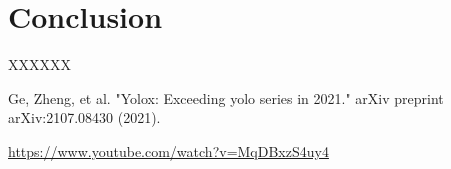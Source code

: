 \documentclass[lettersize,journal]{IEEEtran}
\begin{document}
\section{Conclusion}
XXXXXX
\begin{thebibliography}{1}


  Ge, Zheng, et al. "Yolox: Exceeding yolo series in 2021." arXiv preprint arXiv:2107.08430 (2021).

  \url{https://www.youtube.com/watch?v=MqDBxzS4uy4}

\end{thebibliography}

\vfill
\end{document}
